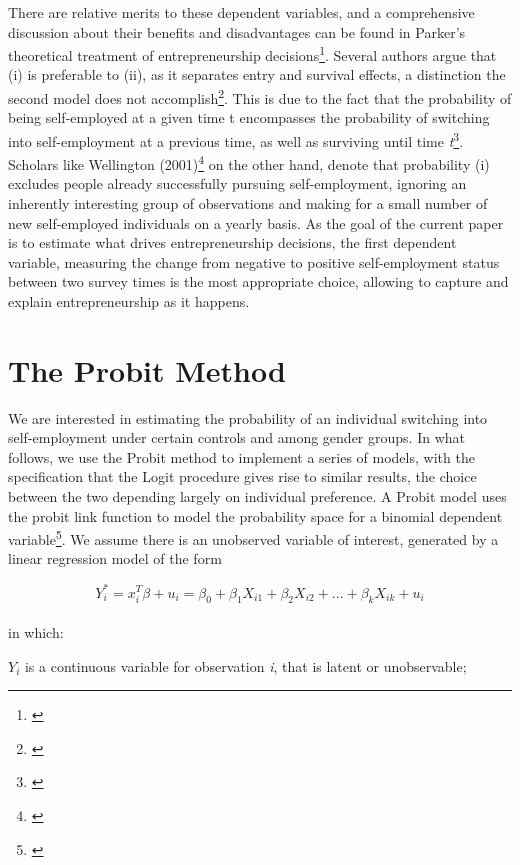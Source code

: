 There are relative merits to these dependent variables, and a comprehensive discussion about their benefits and disadvantages can be found in Parker's theoretical treatment of entrepreneurship decisions\footnote{\cite[Page~26]{Parker2004}}. Several authors argue that (i) is preferable to (ii), as it separates entry and survival effects, a distinction the second model does not accomplish\footnote{\cite{EvansLeighton1989}}. This is due to the fact that the probability of being self-employed at a given time t encompasses the probability of switching into self-employment at a previous time, as well as surviving until time \textit{t}\footnote{\cite{EvansLeighton1989}}. Scholars like Wellington (2001)\footnote{\cite{Wellington2001}} on the other hand, denote that probability (i) excludes people already successfully pursuing self-employment, ignoring an inherently interesting group of observations and making for a small number of new self-employed individuals on a yearly basis. As the goal of the current paper is to estimate what drives entrepreneurship decisions, the first dependent variable, measuring the change from negative to positive self-employment status between two survey times is the most appropriate choice, allowing to capture and explain entrepreneurship as it happens. 


\section{The Probit Method}

We are interested in estimating the probability of an individual switching into self-employment under certain controls and among gender groups. In what follows, we use the Probit method to implement a series of models, with the specification that the Logit  procedure gives rise to similar results, the choice between the two depending largely on individual preference. A Probit model uses the probit link function to model the probability space for a binomial dependent variable\footnote{\cite{AldrichNelson1984}}. We assume there is an unobserved variable of interest, generated by a linear regression model of the form


\begin{dmath}
\mbox{$Y^{*}_{i} = x^{T}_i\beta + u_i = \beta_0 + \beta_1X_{i1} + \beta_2X_{i2} + ... + \beta_kX_{ik} + u_i$}
\end{dmath}
\\
in which:

$Y_i$ is a continuous variable for observation \textit{i}, that is latent or unobservable;

